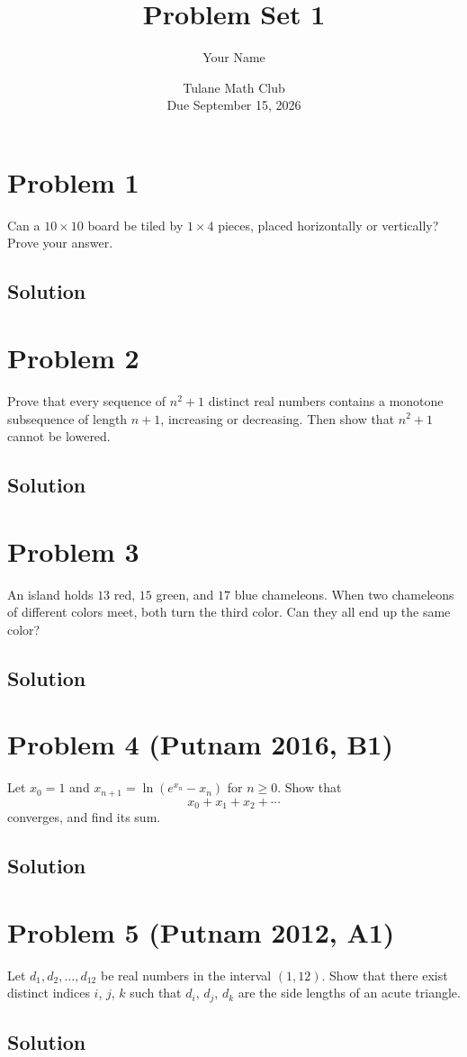 \documentclass[11pt]{article}
\title{Problem Set 1}
\author{Your Name}
\date{Tulane Math Club \\ Due September 15, 2026}
\begin{document}
\maketitle

\section*{Problem 1}

Can a $10 \times 10$ board be tiled by $1 \times 4$ pieces, placed horizontally or
vertically? Prove your answer.

\subsection*{Solution}

\section*{Problem 2}

Prove that every sequence of $n^2 + 1$ distinct real numbers contains a monotone
subsequence of length $n + 1$, increasing or decreasing. Then show that $n^2 + 1$
cannot be lowered.

\subsection*{Solution}

\section*{Problem 3}

An island holds $13$ red, $15$ green, and $17$ blue chameleons. When two chameleons of
different colors meet, both turn the third color. Can they all end up the same color?

\subsection*{Solution}

\section*{Problem 4 (Putnam 2016, B1)}

Let $x_0 = 1$ and $x_{n+1} = \ln(e^{x_n} - x_n)$ for $n \geq 0$. Show that
\[
  x_0 + x_1 + x_2 + \cdots
\]
converges, and find its sum.

\subsection*{Solution}

\section*{Problem 5 (Putnam 2012, A1)}

Let $d_1, d_2, \ldots, d_{12}$ be real numbers in the interval $(1, 12)$. Show that
there exist distinct indices $i$, $j$, $k$ such that $d_i$, $d_j$, $d_k$ are the side
lengths of an acute triangle.

\subsection*{Solution}
\end{document}
